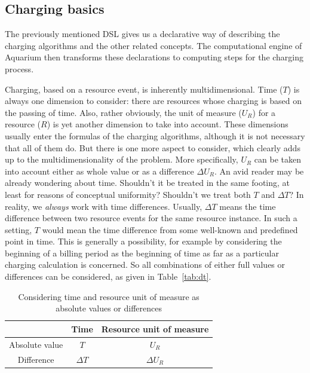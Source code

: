 \documentclass[preprint,10pt]{sigplanconf}
\newcommand{\DTime}{\ensuremath{T}\xspace} %
\newcommand{\DeltaDTime}{\ensuremath{\Delta{T}}\xspace}
\newcommand{\DUnitR}{\ensuremath{U_{R}}\xspace} %
\newcommand{\DeltaDUnitR}{\ensuremath{\Delta U_{R}}\xspace}
\begin{document}
\subsection{Charging basics}
The previously mentioned DSL gives us a declarative way of describing the charging algorithms and the other related concepts. The computational engine of Aquarium then transforms these declarations to computing steps for the charging process.

Charging, based on a resource event, is inherently multidimensional. Time (\DTime) is always one dimension to consider: there are resources whose charging is based on the passing of time. Also, rather obviously, the unit of measure (\DUnitR) for a resource ($R$) is yet another dimension to take into account. These dimensions usually enter the formulas of the charging algorithms, although it is not necessary that all of them do. But there is one more aspect to consider, which clearly adds up to the multidimensionality of the problem. More specifically, \DUnitR can be taken into account either as whole value or as a difference \DeltaDUnitR. An avid reader may be already wondering about time. Shouldn't it be treated in the same footing, at least for reasons of conceptual uniformity? Shouldn't we treat both \DTime and \DeltaDTime? In reality, we \textit{always} work with time differences. Usually, \DeltaDTime means the time difference between two resource events for the same resource instance. In such a setting, \DTime would mean the time difference from some well-known and predefined point in time. This is generally a possibility, for example by considering the beginning of a billing period as the beginning of time as far as a particular charging calculation is concerned. So all combinations of either full values or differences can be considered, as given in Table~\ref{tab:dt}.

\begin{table}[htdp]
\label{tab:dt}
\begin{center}
\begin{tabular}{|c|c|c|}
\hline
&Time & Resource unit of measure \\
\hline
Absolute value & \DTime & \DUnitR \\
Difference & \DeltaDTime  & \DeltaDUnitR \\
\hline
\end{tabular}
\end{center}
\label{default}
\caption{Considering time and resource unit of measure as absolute values or differences
}
\end{table}%
\end{document}
